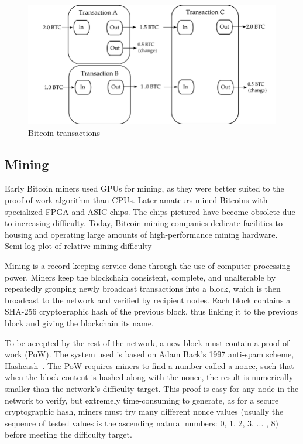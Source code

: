 \begin{figure}[H]
  \begin{center}
    \includegraphics[width=0.6\columnwidth]{images/transactions.png}
  \end{center}
  \caption{Bitcoin transactions}
  \label{fig:transactions}
\end{figure}

\subsection{Mining}

Early Bitcoin miners used GPUs for mining, as they were better suited to the
proof-of-work algorithm than CPUs. Later amateurs mined Bitcoins with
specialized FPGA and ASIC chips. The chips pictured have become obsolete due to
increasing difficulty. Today, Bitcoin mining companies dedicate facilities to
housing and operating large amounts of high-performance mining hardware.
Semi-log plot of relative mining difficulty

Mining is a record-keeping service done through the use of computer processing
power. Miners keep the blockchain consistent, complete, and unalterable by
repeatedly grouping newly broadcast transactions into a block, which is then
broadcast to the network and verified by recipient nodes. Each block
contains a SHA-256 cryptographic hash of the previous block, thus linking
it to the previous block and giving the blockchain its name.

To be accepted by the rest of the network, a new block must contain a
proof-of-work (PoW). The system used is based on Adam Back's 1997 anti-spam
scheme, Hashcash~\cite{hashcash}. The PoW requires miners to find a
number called a nonce, such that when the block content is hashed along with
the nonce, the result is numerically smaller than the network's difficulty
target. This proof is easy for any node in the network to verify, but
extremely time-consuming to generate, as for a secure cryptographic hash,
miners must try many different nonce values (usually the sequence of tested
values is the ascending natural numbers: 0, 1, 2, 3, ... , 8) before
meeting the difficulty target.

